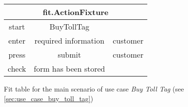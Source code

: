 \begin{figure}[H]
\begin{centering}
\begin{tabular}{|c|c|c|}
\hline 
\multicolumn{3}{|c|}{fit.ActionFixture} \tabularnewline
\hline 
start & BuyTollTag & \tabularnewline
\hline 
enter & required information & customer\tabularnewline
\hline 
press & submit & customer \tabularnewline
\hline 
check & form has been stored & \tabularnewline
\hline 
\end{tabular}
\caption{Fit table for the main scenario of use case \emph{Buy Toll Tag} (see \autoref{sec:use_case_buy_toll_tag})}
\end{centering}
\end{figure}
